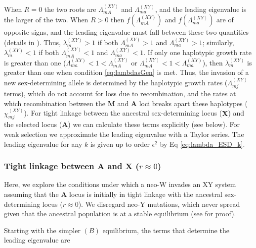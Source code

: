 \documentclass[10pt,letterpaper]{article}
\begin{document}
When $R=0$ the two roots are $\Lambda_{mA}^{(XY)}$ and $\Lambda_{ma}^{(XY)}$, and the leading eigenvalue is the larger of the two.
When $R>0$ then $f(\Lambda_{mA}^{(XY)})$ and $f(\Lambda_{ma}^{(XY)})$ are of opposite signs, and the leading eigenvalue must fall between these two quantities (details in ). %
Thus, $\lambda_m^{(XY)}>1$ if both $\Lambda_{mA}^{(XY)}>1$ and $\Lambda_{ma}^{(XY)}>1$; similarly, $\lambda_m^{(XY)}<1$ if both $\Lambda_{mA}^{(XY)}<1$ and $\Lambda_{ma}^{(XY)}<1$.
If only one haplotypic growth rate is greater than one ($\Lambda_{ma}^{(XY)}<1<\Lambda_{mA}^{(XY)}$ or $\Lambda_{mA}^{(XY)}<1<\Lambda_{ma}^{(XY)}$), then $\lambda_m^{(XY)}$ is greater than one when condition \eqref{eq:lambdasGen} is met. 
Thus, the invasion of a new sex-determining allele is determined by the haplotypic growth rates ($\Lambda_{mj}^{(XY)}$ terms), which do not account for loss due to recombination, and the rates at which recombination between the $\mathbf{M}$ and $\mathbf{A}$ loci breaks apart these haplotypes ($\chi_{mj}^{(XY)}$).
For tight linkage between the ancestral sex-determining locus ($\mathbf{X}$) and the selected locus ($\mathbf{A}$) we can calculate these terms explicitly (see below).
For weak selection we approximate the leading eigenvalue with a Taylor series. 
The leading eigenvalue for any $k$ is given up to order $\epsilon^2$ by Eq \eqref{eq:lambda_ESD_k}.

\subsubsection*{Tight linkage between $\mathbf{A}$ and $\mathbf{X}$ ($r \approx 0$)}

Here, we explore the conditions under which a neo-W invades an XY system assuming that the $\mathbf{A}$ locus is initially in tight linkage with the ancestral sex-determining locus ($r \approx 0$). 
We disregard neo-Y mutations, which never spread given that the ancestral population is at a stable equilibrium (see  for proof). 

Starting with the simpler $(B)$ equilibrium, the terms that determine the leading eigenvalue are
\end{document}
